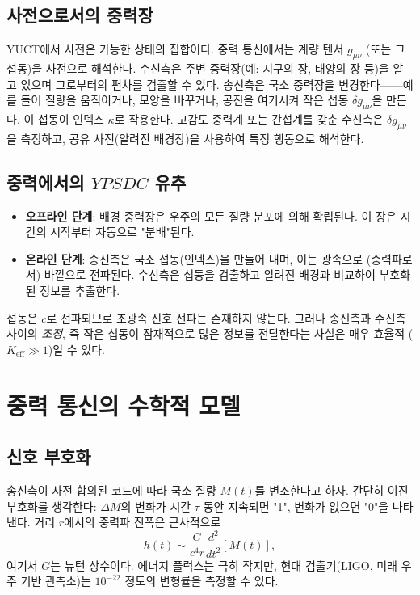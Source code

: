 \documentclass[12pt,a4paper]{article}
\newcommand{\Keff}{K_{\mathrm{eff}}}
\newcommand{\YPSDC}{YPSDC}
\begin{document}
	\subsection{사전으로서의 중력장}
	
	YUCT에서 사전은 가능한 상태의 집합이다. 중력 통신에서는 계량 텐서 \(g_{\mu\nu}\) (또는 그 섭동)을 사전으로 해석한다. 수신측은 주변 중력장(예: 지구의 장, 태양의 장 등)을 알고 있으며 그로부터의 편차를 검출할 수 있다. 송신측은 국소 중력장을 변경한다——예를 들어 질량을 움직이거나, 모양을 바꾸거나, 공진을 여기시켜 작은 섭동 \(\delta g_{\mu\nu}\)을 만든다. 이 섭동이 인덱스 \(\kappa\)로 작용한다. 고감도 중력계 또는 간섭계를 갖춘 수신측은 \(\delta g_{\mu\nu}\)을 측정하고, 공유 사전(알려진 배경장)을 사용하여 특정 행동으로 해석한다.
	
	\subsection{중력에서의 \(\YPSDC\) 유추}
	
	\begin{itemize}
		\item \textbf{오프라인 단계}: 배경 중력장은 우주의 모든 질량 분포에 의해 확립된다. 이 장은 시간의 시작부터 자동으로 "분배"된다.
		\item \textbf{온라인 단계}: 송신측은 국소 섭동(인덱스)을 만들어 내며, 이는 광속으로 (중력파로서) 바깥으로 전파된다. 수신측은 섭동을 검출하고 알려진 배경과 비교하여 부호화된 정보를 추출한다.
	\end{itemize}
	
	섭동은 \(c\)로 전파되므로 초광속 신호 전파는 존재하지 않는다. 그러나 송신측과 수신측 사이의 \emph{조정}, 즉 작은 섭동이 잠재적으로 많은 정보를 전달한다는 사실은 매우 효율적 (\(\Keff \gg 1\))일 수 있다.
	
	\section{중력 통신의 수학적 모델}
	\label{sec:model}
	
	\subsection{신호 부호화}
	
	송신측이 사전 합의된 코드에 따라 국소 질량 \(M(t)\)를 변조한다고 하자. 간단히 이진 부호화를 생각한다: \(\Delta M\)의 변화가 시간 \(\tau\) 동안 지속되면 "1", 변화가 없으면 "0"을 나타낸다. 거리 \(r\)에서의 중력파 진폭은 근사적으로
	\begin{equation}
		h(t) \sim \frac{G}{c^4 r} \frac{d^2}{dt^2} \left[ M(t) \right],
	\end{equation}
	여기서 \(G\)는 뉴턴 상수이다. 에너지 플럭스는 극히 작지만, 현대 검출기(LIGO, 미래 우주 기반 관측소)는 \(10^{-22}\) 정도의 변형률을 측정할 수 있다.
	
\end{document}
